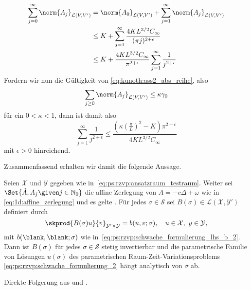 \begin{Satz}
\begin{Beweis}
        \begin{align}
                    \sum_{j = 0}^{\infty} \norm{A_{j}}_{\mathcal L(V, V')}
            &= \norm{A_{0}}_{\mathcal L(V, V')} + \sum_{j = 1}^{\infty} \norm{A_{j}}_{\mathcal L(V, V')}
            \\&\leq K + \sum_{j = 1}^{\infty} \frac{4 K L^{3 / 2} C_{\infty}}{(\pi j)^{2 + \epsilon}}
            \\&\leq K + \frac{4 K L^{3 / 2} C_{\infty}}{\pi^{2+ \epsilon}} \sum_{j = 1}^{\infty} \frac{1}{j^{2 + \epsilon}}
        \end{align}
        Fordern wir nun die Gültigkeit von \cref{eq:kunoth:ass2_abs_reihe}, also
        \begin{equation}
            \sum_{j \geq 0} \norm{A_{j}}_{\mathcal L(V, V')} \leq \kappa \gamma_{0}
        \end{equation}
        für ein $0 < \kappa < 1$, dann ist damit also
        \begin{equation}
            \sum_{j = 1}^{\infty} \frac{1}{j^{2 + \epsilon}} \leq \frac{(\kappa (\tfrac{\pi}{L})^{2} - K) \pi^{2+ \epsilon}}{4 K L^{3/2} C_{\infty}}
        \end{equation}
        mit $\epsilon > 0$ hinreichend.
    \end{Beweis}
\end{Satz}

Zusammenfassend erhalten wir damit die folgende Aussage.

\begin{Satz}
    Seien $\mathcal X$ und $\mathcal Y$ gegeben wie in~\cref{eq:ps:rzvp:ansatzraum_testraum}.
    Weiter sei $\Set{\hat A, A_{j} \given j \in \mathbb{N}_{0}}$ die affine Zerlegung von $A = -c \Delta + \omega$ wie in \cref{eq:1d:affine_zerlegung} und es gelte .
    Für jedes $\sigma \in \mathcal S$ sei $B(\sigma) \in \mathcal L(\mathcal X, \mathcal Y')$ definiert durch
    \begin{equation}
        \label{eq:ps:rg:theorem21_variationsproblem_als_operatorgleichung_parametrisch}
        \skprod{B(\sigma) u}{v}_{\mathcal Y' \times \mathcal Y} = b(u, v; \sigma), \quad u \in \mathcal X,~y \in \mathcal Y,
    \end{equation}
    mit $b(\blank, \blank; \sigma)$ wie in~\cref{eq:ps:rzvp:schwache_formulierung_lhs_b_2}.
    Dann ist $B(\sigma)$ für jedes $\sigma \in \mathcal S$ stetig invertierbar und die parametrische Familie von Lösungen $u(\sigma)$ des parametrischen Raum-Zeit-Variationsproblems \cref{eq:ps:rzvp:schwache_formulierung_2} hängt analytisch von $\sigma$ ab.

    \begin{Beweis}
        Direkte Folgerung aus  und .
    \end{Beweis}
\end{Satz}

